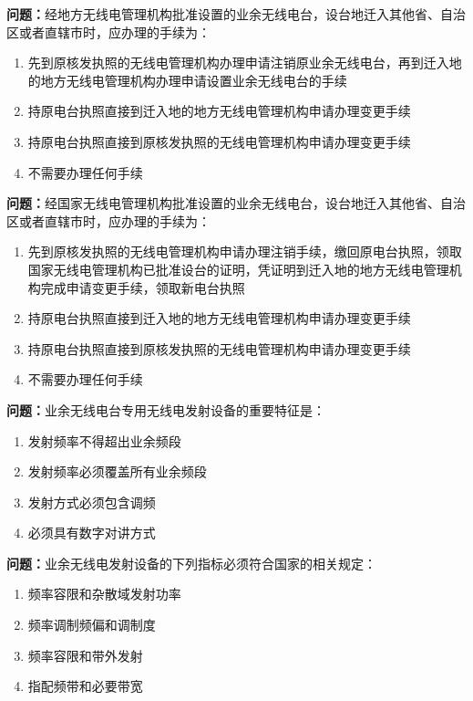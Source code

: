 \documentclass[UTF8]{ctexbook}
\begin{document}
\textbf{问题：}经地方无线电管理机构批准设置的业余无线电台，设台地迁入其他省、自治区或者直辖市时，应办理的手续为：
\begin{enumerate}[label=\Alph*), leftmargin=3em]
  \item 先到原核发执照的无线电管理机构办理申请注销原业余无线电台，再到迁入地的地方无线电管理机构办理申请设置业余无线电台的手续
  \item 持原电台执照直接到迁入地的地方无线电管理机构申请办理变更手续
  \item 持原电台执照直接到原核发执照的无线电管理机构申请办理变更手续
  \item 不需要办理任何手续
\end{enumerate}

\textbf{问题：}经国家无线电管理机构批准设置的业余无线电台，设台地迁入其他省、自治区或者直辖市时，应办理的手续为：
\begin{enumerate}[label=\Alph*), leftmargin=3em]
  \item 先到原核发执照的无线电管理机构申请办理注销手续，缴回原电台执照，领取国家无线电管理机构已批准设台的证明，凭证明到迁入地的地方无线电管理机构完成申请变更手续，领取新电台执照
  \item 持原电台执照直接到迁入地的地方无线电管理机构申请办理变更手续
  \item 持原电台执照直接到原核发执照的无线电管理机构申请办理变更手续
  \item 不需要办理任何手续
\end{enumerate}

\textbf{问题：}业余无线电台专用无线电发射设备的重要特征是：
\begin{enumerate}[label=\Alph*), leftmargin=3em]
  \item 发射频率不得超出业余频段
  \item 发射频率必须覆盖所有业余频段
  \item 发射方式必须包含调频
  \item 必须具有数字对讲方式
\end{enumerate}

\textbf{问题：}业余无线电发射设备的下列指标必须符合国家的相关规定：
\begin{enumerate}[label=\Alph*), leftmargin=3em]
  \item 频率容限和杂散域发射功率
  \item 频率调制频偏和调制度
  \item 频率容限和带外发射
  \item 指配频带和必要带宽
\end{enumerate}
\end{document}
